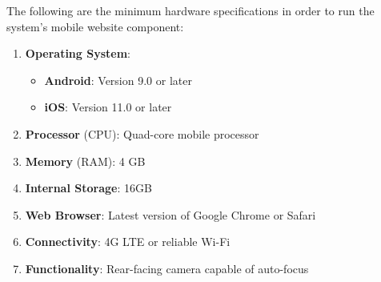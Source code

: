\documentclass[11pt,a4paper,titlepage]{article}
\begin{document}
	The following are the minimum hardware specifications in order to run the system's mobile website component: 
	\begin{enumerate}
		\item \textbf{Operating System}:
		\begin{itemize}
			\item \textbf{Android}: Version 9.0 or later 
			\item \textbf{iOS}: Version 11.0 or later 
		\end{itemize}
		\item \textbf{Processor} (CPU): Quad-core mobile processor 
		\item \textbf{Memory} (RAM): 4 GB 
		\item \textbf{Internal Storage}: 16GB 
		\item \textbf{Web Browser}: Latest version of Google Chrome or Safari
		\item \textbf{Connectivity}: 4G LTE or reliable Wi-Fi 
		\item \textbf{Functionality}: Rear-facing camera capable of auto-focus
	\end{enumerate}
\end{document}
